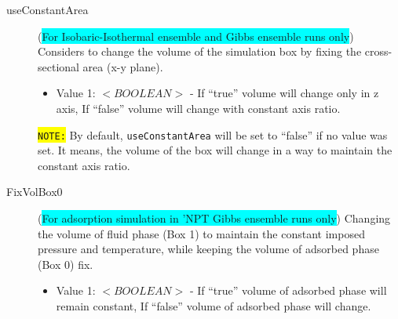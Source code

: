 \begin{description}
\item [useConstantArea] (\colorbox{cyan}{For Isobaric-Isothermal ensemble and Gibbs ensemble runs only}) Considers to change the volume of the simulation box by fixing the cross-sectional area (x-y plane).
	\begin{itemize}
	\item Value 1: $<BOOLEAN>$ - If ``true'' volume will change only in z axis, If ``false'' volume will change with constant axis ratio.
	\end{itemize}
	\colorbox{yellow}{\texttt{NOTE:}} By default, \texttt{useConstantArea} will be set to ``false'' if no value was set. It means, the volume of the box will change in a way to maintain the constant axis ratio.
	
\item [FixVolBox0] (\colorbox{cyan}{For adsorption simulation in 'NPT Gibbs ensemble runs only}) Changing the volume of fluid phase (Box 1) to maintain the constant imposed pressure  and temperature, while keeping the volume of adsorbed phase (Box 0) fix.
	\begin{itemize}
	\item Value 1: $<BOOLEAN>$ - If ``true'' volume of adsorbed phase will remain constant, If ``false'' volume of adsorbed phase will change.
	\end{itemize}


\end{description}

